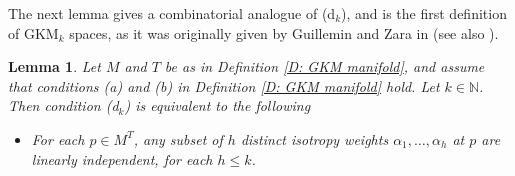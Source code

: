 \documentclass[12pt,a4paper]{amsart}
\newcommand{\NN}{\mathbb{N}}
\theoremstyle{plain}
\newtheorem{lemma}[thm]{Lemma}
\theoremstyle{definition}
\begin{document}
The next lemma gives a combinatorial analogue of (d$_k$), and is the first definition of GKM$_k$ spaces, as it was originally given by Guillemin and Zara in \cite[Section 2.10]{MR1701922} (see also \cite{MR3456711}).
\begin{lemma}\label{dk equivalent d'k}
Let $M$ and $T$ be as in Definition \ref{D: GKM manifold}, and assume that conditions
(a) and (b) in Definition \ref{D: GKM manifold} hold. 
Let $k\in \NN$. 
Then condition (d$_k$) is equivalent to the following
\begin{itemize}
\item [(d$_k$')] For each $p\in M^T$, any subset of $h$ distinct isotropy weights $\alpha_1,\ldots, \alpha_h$ at $p$ are \emph{linearly independent}, for each $h\leq k$.
\end{itemize}
\end{lemma}
\end{document}
